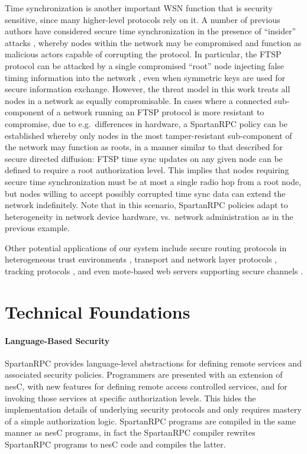 Time synchronization is another important WSN function that is security
sensitive, since many higher-level protocols rely on it. A number of
previous authors have considered secure time synchronization in the
presence of ``insider'' attacks
\cite{Manzo:2005:TSA:1102219.1102238,Ganeriwal:2008:STS:1380564.1380571},
whereby nodes within the network may be compromised and function as
malicious actors capable of corrupting the protocol. In particular, the
FTSP protocol can be attacked by a single compromised ``root'' node
injecting false timing information into the network
\cite{Manzo:2005:TSA:1102219.1102238}, even when symmetric keys are used
for secure information exchange. However, the threat model in this work
treats all nodes in a network as equally compromisable. In cases where a
connected sub-component of a network running an FTSP protocol is more
resistant to compromise, due to e.g.~differences in hardware, a
SpartanRPC policy can be established whereby only nodes in the most
tamper-resistant sub-component of the network may function as roots, in
a manner similar to that described for secure directed diffusion: FTSP
time sync updates on any given node can be defined to require a root
authorization level. This implies that nodes requiring secure time
synchronization must be at most a single radio hop from a root node, but
nodes willing to accept possibly corrupted time sync data can extend the
network indefinitely. Note that in this scenario, SpartanRPC policies
adapt to heterogeneity in network device hardware, vs.~network
administration as in the previous example.

Other potential applications of our system include secure routing
protocols in heterogeneous trust environments \cite{senroute-ahnj03},
transport and network layer protocols \cite{perillo-heinzelman-2005},
tracking protocols \cite{brooks-ramanathan-sayeed-2003}, and even
mote-based web servers supporting secure channels \cite{1049776}.  

\section{Technical Foundations}

\paragraph{Language-Based Security} SpartanRPC provides language-level 
abstractions for defining remote services and associated security
policies.  Programmers are presented with an extension of nesC, with
new features for defining remote access controlled services, and for
invoking those services at specific authorization levels. This hides
the implementation details of underlying security protocols and only
requires mastery of a simple authorization logic. SpartanRPC programs
are compiled in the same manner as nesC programs, in fact the
SpartanRPC compiler rewrites SpartanRPC programs to nesC code and
compiles the latter.

